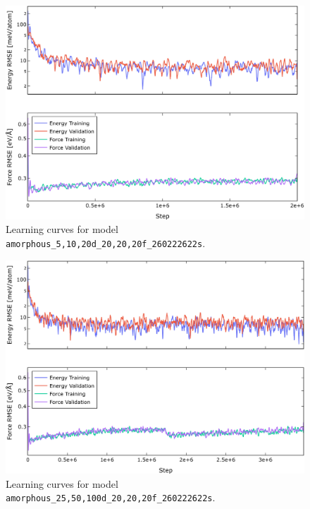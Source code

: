 \begin{figure}
  \begin{center}
    \includegraphics[width=.8\textwidth]{
      asset/amorphous_5,10,20d_20,20,20f_260222622s_energy_force_l_curve.jpg
    }
  \end{center}
  \caption{Learning curves for model \texttt{amorphous\_5,10,20d\_20,20,20f\_260222622s}.}
  \label{fig:amorphous_5,10,20d_20,20,20f_260222622s-learning-curves}
\end{figure}

\begin{figure}
  \begin{center}
    \includegraphics[width=.8\textwidth]{
      asset/amorphous_25,50,100d_20,20,20f_260222622s_energy_force_l_curve.jpg
    }
  \end{center}
  \caption{Learning curves for model \texttt{amorphous\_25,50,100d\_20,20,20f\_260222622s}.}
  \label{fig:amorphous_25,50,100d_20,20,20f_260222622s-learning-curves}
\end{figure}


